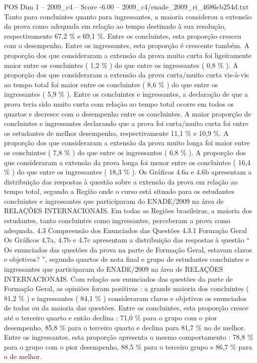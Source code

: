 \begin{textsample}{POS Dim 1 – 2009\_c4 – Score -6.00 – 2009\_c4/enade\_2009\_ri\_4686cb254d.txt}
Tanto para concluintes quanto para ingressantes, a maioria considerou a extensão da prova como adequada em relação ao tempo destinado à sua resolução, respectivamente 67,2 \% e 69,1 \%.
Entre os concluintes, esta proporção cresceu com o desempenho.
Entre os ingressantes, esta proporção é crescente também.
A proporção dos que consideraram a extensão da prova muito curta foi ligeiramente maior entre os concluintes ( 1,2 \% ) do que entre os ingressantes ( 0,8 \% ).
A proporção dos que consideraram a extensão da prova curta/muito curta vis-à-vis ao tempo total foi maior entre os concluintes ( 8,6 \% ) do que entre os ingressantes ( 5,9 \% ).
Entre os concluintes e ingressantes, a declaração de que a prova teria sido muito curta com relação ao tempo total ocorre em todos os quartos e decresce com o desempenho entre os concluintes.
A maior proporção de concluintes e ingressantes declarando que a prova foi curta/muito curta foi entre os estudantes de melhor desempenho, respectivamente 11,1 \% e 10,9 \%.
A proporção dos que consideraram a extensão da prova muito longa foi maior entre os concluintes ( 7,8 \% ) do que entre os ingressantes ( 6,8 \% ).
A proporção dos que consideraram a extensão da prova longa foi menor entre os concluintes ( 16,4 \% ) do que entre os ingressantes ( 18,3 \% ).
Os Gráficos 4.6a e 4.6b apresentam a distribuição das respostas à questão sobre a extensão da prova em relação ao tempo total, segundo a Região onde o curso está situado para os estudantes concluintes e ingressantes que participaram do ENADE/2009 na área de RELAÇÕES INTERNACIONAIS.
Em todas as Regiões brasileiras, a maioria dos estudantes, tanto concluintes como ingressantes, perceberam a prova como adequada. 4.3 Compreensão dos Enunciados das Questões 4.3.1 Formação Geral Os Gráficos 4.7a, 4.7b e 4.7c apresentam a distribuição das respostas à questão “ Os enunciados das questões da prova na parte de Formação Geral, estavam claros e objetivos? ”, segundo quartos de nota final e grupo de estudantes concluintes e ingressantes que participaram do ENADE/2009 na área de RELAÇÕES INTERNACIONAIS.
Com relação aos enunciados das questões da parte de Formação Geral, as opiniões foram positivas : a grande maioria dos concluintes ( 81,2 \% ) e ingressantes ( 84,1 \% ) consideraram claros e objetivos os enunciados de todas ou da maioria das questões.
Entre os concluintes, esta proporção cresce até o terceiro quarto e então declina : 71,0 \% para o grupo com o pior desempenho, 85,8 \% para o terceiro quarto e declina para 81,7 \% no de melhor.
Entre os ingressantes, esta proporção apresenta o mesmo comportamento : 78,8 \% para o grupo com o pior desempenho, 88,5 \% para o terceiro grupo e 86,7 \% para o de melhor.

\end{textsample}
